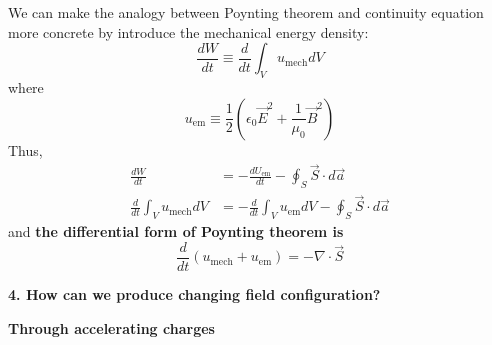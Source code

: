We can make the analogy between Poynting theorem and continuity equation more concrete by introduce the mechanical energy density:
$$
\frac{d W}{d t} \equiv \frac{d}{d t} \int_{V} u_{\mathrm{mech}} d V
$$
where
$$
u_{\mathrm{em}} \equiv \frac{1}{2}\left(\epsilon_{0} \vec{E}^{2}+\frac{1}{\mu_{0}} \vec{B}^{2}\right)
$$
Thus,
$$
\begin{aligned}
\frac{d W}{d t} &=-\frac{d U_{\mathrm{em}}}{d t}-\oint_{S} \vec{S} \cdot d \vec{a} \\
\frac{d}{d t} \int_{V} u_{\mathrm{mech}} d V &=-\frac{d}{d t} \int_{V} u_{\mathrm{em}} d V-\oint_{S} \vec{S} \cdot d \vec{a}
\end{aligned}
$$
and \textbf{the differential form of Poynting theorem is}
$$
\frac{d}{d t}\left(u_{\mathrm{mech}}+u_{\mathrm{em}}\right)=-\nabla \cdot \vec{S}
$$
\begin{mybox}
\textbf{4. How can we produce changing field configuration?}
\end{mybox}
\begin{mybox2}
\textbf{Through accelerating charges}
\end{mybox2}

